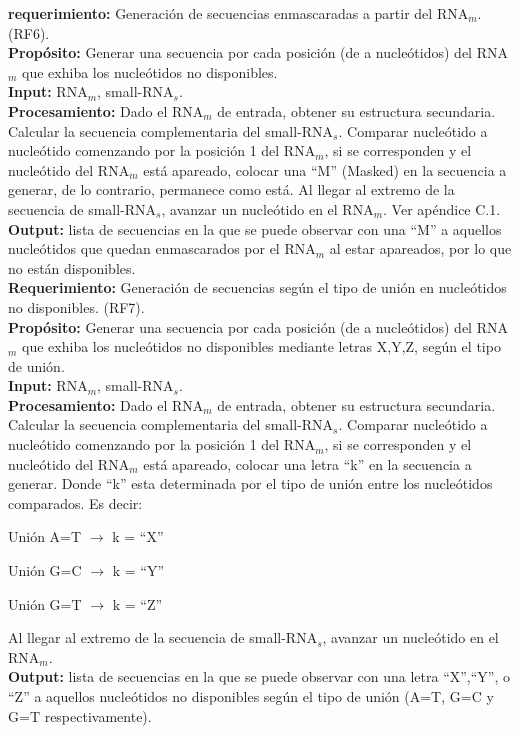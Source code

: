 \documentclass[12pt,a4paper,spanish]{article}
\begin{document}
\begin{itemize}
 		\textbf{requerimiento:} Generación de secuencias enmascaradas a partir del RNA$_m$. (RF6).\\
 	    \textbf{Propósito:} Generar una secuencia por cada posición (de a nucleótidos) del RNA$_m$ que exhiba los 								nucleótidos no disponibles. \\
		\textbf{Input:} RNA$_m$, small-RNA$_s$. \\
		\textbf{Procesamiento:} Dado el RNA$_m$ de entrada, obtener su estructura secundaria. Calcular la 									secuencia complementaria del small-RNA$_s$. Comparar nucleótido a nucleótido 									comenzando por la posición 1 del RNA$_m$, si se corresponden y el nucleótido 									del RNA$_m$ está apareado, colocar una ``M'' (Masked) en la secuencia a generar, de lo 									contrario, permanece como está. Al llegar al extremo de la secuencia de small-RNA$_s$, 									avanzar un nucleótido en el RNA$_m$. Ver apéndice C.1. \\
		\textbf{Output:} lista de secuencias en la que se puede observar con una ``M'' a aquellos nucleótidos que quedan 							 enmascarados por el RNA$_m$ al estar apareados, por lo que no están disponibles. \\

 		\textbf{Requerimiento:} Generación de secuencias según el tipo de unión en nucleótidos no disponibles. (RF7).\\
 	    \textbf{Propósito:} Generar una secuencia por cada posición (de a nucleótidos) del RNA$_m$ que exhiba los 								nucleótidos no disponibles mediante letras X,Y,Z, según el tipo de unión. \\
		\textbf{Input:} RNA$_m$, small-RNA$_s$. \\
		\textbf{Procesamiento:} Dado el RNA$_m$ de entrada, obtener su estructura secundaria. Calcular la 									secuencia complementaria del small-RNA$_s$. Comparar nucleótido a nucleótido 									comenzando por la posición 1 del RNA$_m$, si se corresponden y el nucleótido 									del RNA$_m$ está apareado, colocar una letra ``k'' en la secuencia a generar. Donde ``k'' 									esta determinada por el	tipo de unión entre los nucleótidos comparados. Es decir:  
								\par \hspace*{2.85cm} \noindent Unión A=T $\to$ k = ``X''
								\par \hspace*{2.85cm} \noindent Unión G=C $\to$ k = ``Y''
								\par \hspace*{2.85cm} \noindent Unión G=T $\to$ k = ``Z'' 
								\par Al llegar al extremo de la secuencia de small-RNA$_s$, avanzar un nucleótido en el 								RNA$_m$. \\
		\textbf{Output:} lista de secuencias en la que se puede observar con una letra ``X'',``Y'', o ``Z'' a aquellos 							 nucleótidos no disponibles según el tipo de unión (A=T, G=C y G=T respectivamente).


\end{itemize}
\end{document}
